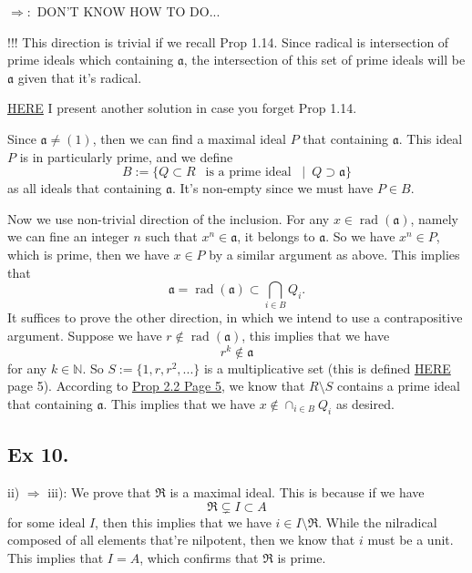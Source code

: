 \noindent$\Rightarrow:$ DON'T KNOW HOW TO DO... 

!!! This direction is trivial if we recall Prop 1.14. Since radical is intersection of prime ideals which containing $\mathfrak a$, the intersection of this set of prime ideals will be $\mathfrak a$ given that it's radical.


\href{https://math.stackexchange.com/questions/49309/intersection-of-prime-ideals}{HERE} I present another solution in case you forget Prop 1.14.

Since $\mathfrak a\neq (1)$, then we can find a maximal ideal $P$ that containing $\mathfrak a$. This ideal $P$ is in particularly prime, and we define 
$$B:=\{Q\subset R ~~\text{ is a prime ideal }~\mid~ Q\supset \mathfrak a\}$$
as all ideals that containing $\mathfrak a$. It's non-empty since we must have $P\in B$. 

Now we use non-trivial direction of the inclusion. For any $x\in \operatorname{rad}(\mathfrak a)$, namely we can fine an integer $n$ such that $x^n\in \mathfrak a$, it belongs to $\mathfrak a$. So we have $x^n\in P$, which is prime, then we have $x\in P$ by a similar argument as above. This implies that 
$$\mathfrak a=\operatorname{rad}(\mathfrak a)\subset \bigcap_{i\in B}Q_i.$$
It suffices to prove the other direction, in which we intend to use a contrapositive argument. Suppose we have $r\notin \operatorname{rad}(\mathfrak a)$, this implies that we have 
$$r^k\notin \mathfrak a$$ for any $k\in \mathbb N$. So $S:=\{1,r,r^2,...\}$ is a multiplicative set (this is defined \href{https://www.jmilne.org/math/xnotes/CA.pdf}{HERE} page 5). 
According to \href{https://www.jmilne.org/math/xnotes/CA.pdf}{Prop 2.2 Page 5}, we know that $R\setminus S$ contains a prime ideal that containing $\mathfrak a$. This implies that we have $x\notin \cap_{i\in B}Q_i$ as desired.

\newpage\subsection{Ex 10.}

ii) $\Rightarrow$ iii): We prove that $\mathfrak R$ is a maximal ideal. This is because if we have
$$\mathfrak R\subsetneq I\subset A$$ for some ideal $I$, then this implies that we have $i\in I\setminus \mathfrak R$. While the nilradical composed of all elements that're nilpotent, then we know that $i$ must be a unit. This implies that $I=A$, which confirms that $\mathfrak R$ is prime.\\

